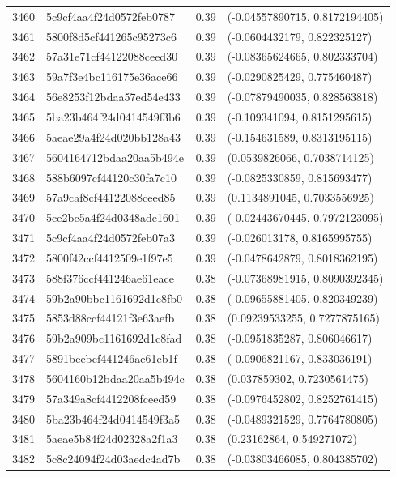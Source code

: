 \begin{table}[ht]
\begin{tabular}{rlrl}
  3460 & 5c9cf4aa4f24d0572feb0787 & 0.39 & (-0.04557890715, 0.8172194405) \\ 
  3461 & 5800f8d5cf441265c95273c6 & 0.39 & (-0.0604432179, 0.822325127) \\ 
  3462 & 57a31e71cf44122088ceed30 & 0.39 & (-0.08365624665, 0.802333704) \\ 
  3463 & 59a7f3e4bc116175e36ace66 & 0.39 & (-0.0290825429, 0.775460487) \\ 
  3464 & 56e8253f12bdaa57ed54e433 & 0.39 & (-0.07879490035, 0.828563818) \\ 
  3465 & 5ba23b464f24d0414549f3b6 & 0.39 & (-0.109341094, 0.8151295615) \\ 
  3466 & 5aeae29a4f24d020bb128a43 & 0.39 & (-0.154631589, 0.8313195115) \\ 
  3467 & 5604164712bdaa20aa5b494e & 0.39 & (0.0539826066, 0.7038714125) \\ 
  3468 & 588b6097cf44120c30fa7c10 & 0.39 & (-0.0825330859, 0.815693477) \\ 
  3469 & 57a9caf8cf44122088ceed85 & 0.39 & (0.1134891045, 0.7033556925) \\ 
  3470 & 5ce2bc5a4f24d0348ade1601 & 0.39 & (-0.02443670445, 0.7972123095) \\ 
  3471 & 5c9cf4aa4f24d0572feb07a3 & 0.39 & (-0.026013178, 0.8165995755) \\ 
  3472 & 5800f42ccf4412509e1f97e5 & 0.39 & (-0.0478642879, 0.8018362195) \\ 
  3473 & 588f376ccf441246ae61eace & 0.38 & (-0.07368981915, 0.8090392345) \\ 
  3474 & 59b2a90bbc1161692d1c8fb0 & 0.38 & (-0.09655881405, 0.820349239) \\ 
  3475 & 5853d88ccf44121f3e63aefb & 0.38 & (0.09239533255, 0.7277875165) \\ 
  3476 & 59b2a909bc1161692d1c8fad & 0.38 & (-0.0951835287, 0.806046617) \\ 
  3477 & 5891beebcf441246ae61eb1f & 0.38 & (-0.0906821167, 0.833036191) \\ 
  3478 & 5604160b12bdaa20aa5b494c & 0.38 & (0.037859302, 0.7230561475) \\ 
  3479 & 57a349a8cf4412208fceed59 & 0.38 & (-0.0976452802, 0.8252761415) \\ 
  3480 & 5ba23b464f24d0414549f3a5 & 0.38 & (-0.0489321529, 0.7764780805) \\ 
  3481 & 5aeae5b84f24d02328a2f1a3 & 0.38 & (0.23162864, 0.549271072) \\ 
  3482 & 5c8c24094f24d03aedc4ad7b & 0.38 & (-0.03803466085, 0.804385702) \\ 

\end{tabular}
\end{table}
